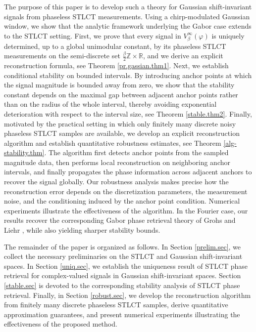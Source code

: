 \documentclass[11pt, reqno]{amsart}
\numberwithin{equation}{section}
\begin{document}
The purpose of this paper is to develop such a theory for Gaussian shift-invariant signals from phaseless STLCT measurements. Using a chirp-modulated Gaussian window, we show that the analytic framework underlying the Gabor case extends to the STLCT setting. First, we prove that every signal in $V_\beta^\infty(\varphi)$ is uniquely determined, up to a global unimodular constant, by its phaseless STLCT measurements on the semi-discrete set $\frac{\beta}{2}\mathbb Z\times\mathbb R$, and we derive an explicit reconstruction formula, see Theorem \ref{pr.gassian.thm1}. Next, we establish conditional stability on bounded intervals. By introducing anchor points at which the signal magnitude is bounded away from zero, we show that the stability constant depends on the maximal gap between adjacent anchor points rather than on the radius of the whole interval, thereby avoiding exponential deterioration with respect to the interval size, see Theorem \ref{stable.thm2}.  Finally, motivated by the practical setting in which only finitely many discrete noisy phaseless STLCT samples are available, we develop an explicit reconstruction algorithm and establish quantitative robustness estimates, see Theorem \ref{alg-stability.thm}. The algorithm first detects anchor points from the sampled magnitude data, then performs local reconstruction on neighboring anchor intervals, and finally propagates the phase information across adjacent anchors to recover the signal globally. Our robustness analysis makes precise how the reconstruction error depends on the discretization parameters, the measurement noise, and the conditioning induced by the anchor point condition. Numerical experiments illustrate the effectiveness of the algorithm. In the Fourier case, our results recover the corresponding Gabor phase retrieval theory of Grohs and Liehr \cite{grohs2024stable}, while also yielding sharper stability bounds.


The remainder of the paper is organized as follows. In Section \ref{prelim.sec}, we collect the necessary preliminaries on the STLCT and Gaussian shift-invariant spaces. In Section \ref{uniq.sec}, we establish the uniqueness result of STLCT phase retrieval for complex-valued signals in Gaussian shift-invariant spaces. Section \ref{stable.sec} is devoted to the corresponding stability analysis of STLCT phase retrieval. Finally, in Section \ref{robust.sec}, we develop the reconstruction algorithm from finitely many discrete phaseless STLCT samples, derive quantitative approximation guarantees, and present numerical experiments illustrating the effectiveness of the proposed method.
\end{document}
